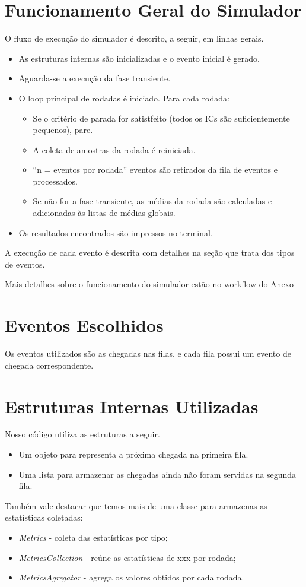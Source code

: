 \documentclass[a4paper,12pt]{report}
\begin{document}
\section{Funcionamento Geral do Simulador}
O fluxo de execução do simulador é descrito, a seguir, em linhas gerais.
\begin{itemize}
  \item As estruturas internas são inicializadas e o evento inicial é gerado.
  \item Aguarda-se a execução da fase transiente.
  \item O loop principal de rodadas é iniciado. Para cada rodada:
  \begin{itemize}
    \item Se o critério de parada for satistfeito (todos os ICs são suficientemente pequenos), pare.
    \item A coleta de amostras da rodada é reiniciada.
    \item “n = eventos por rodada” eventos são retirados da fila de eventos e processados.
    \item Se não for a fase transiente, as médias da rodada são calculadas e adicionadas às listas de médias globais.
\end{itemize}
  \item Os resultados encontrados são impressos no terminal.
\end{itemize}

A execução de cada evento é descrita com detalhes na seção que trata dos tipos de eventos.

Mais detalhes sobre o funcionamento do simulador estão no workflow do Anexo %

\section{Eventos Escolhidos}
Os eventos utilizados são as chegadas nas filas, e cada fila possui um evento de chegada correspondente.

\section{Estruturas Internas Utilizadas}
Nosso código utiliza as estruturas a seguir.
\begin{itemize}
  \item Um objeto para representa a próxima chegada na primeira fila.
  \item Uma lista para armazenar as chegadas ainda não foram servidas na segunda fila.
\end{itemize}
Também vale destacar que temos mais de uma classe para armazenas as estatísticas coletadas:
\begin{itemize}
  \item \textit{Metrics} - coleta das estatísticas por tipo;
  \item \textit{MetricsCollection} - reúne as estatísticas de xxx por rodada;
  \item \textit{MetricsAgregator} - agrega os valores obtidos por cada rodada.
\end{itemize}
\end{document}
